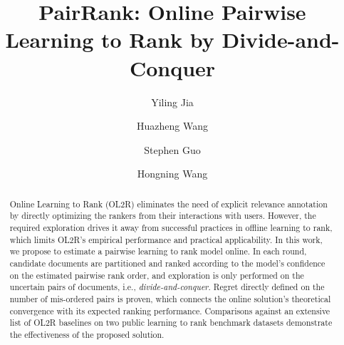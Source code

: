 \documentclass[sigconf]{acmart}
\theoremstyle{definition}
\theoremstyle{remark}
\begin{document}
\title{PairRank: Online Pairwise Learning to Rank by Divide-and-Conquer}
\newcommand{\model}{{PairRank}}


\author{Yiling Jia}

\author{Huazheng Wang}

\author{Stephen Guo}

\author{Hongning Wang}



\begin{abstract}
Online Learning to Rank (OL2R) eliminates the need of explicit relevance annotation by directly optimizing the rankers from their interactions with users. However, the required exploration drives it away from successful practices in offline learning to rank, which limits OL2R's empirical performance and practical applicability.
In this work, we propose to estimate a pairwise learning to rank model online. In each round, candidate documents are partitioned and ranked according to the model's confidence on the estimated pairwise rank order, and exploration is only performed on the uncertain pairs of documents, i.e., \emph{divide-and-conquer}.  
Regret directly defined on the number of mis-ordered pairs is proven, which connects the online solution's theoretical convergence with its expected ranking performance. Comparisons against an extensive list of OL2R baselines on two public learning to rank benchmark datasets demonstrate the effectiveness of the proposed solution.
\end{abstract}
\end{document}

